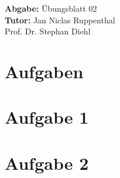 \documentclass[11pt,a4paper]{article}
\title{\course}
\author{\studentname\\Matrikelnummer: \studentnumber\\\institute}
\date{\today}
\newcommand{\sheetnumber}{02}
\newcommand{\tutor}{Jan Niclas Ruppenthal\\Prof. Dr. Stephan Diehl}
\begin{document}
\maketitle

\begin{center}
    \textbf{Abgabe:} \"Ubungsblatt \sheetnumber \\
    \vspace{4mm}
    \textbf{Tutor:} \tutor
\end{center}

\bigskip

\section*{Aufgaben}

\section{Aufgabe 1}

\section{Aufgabe 2}
\end{document}
